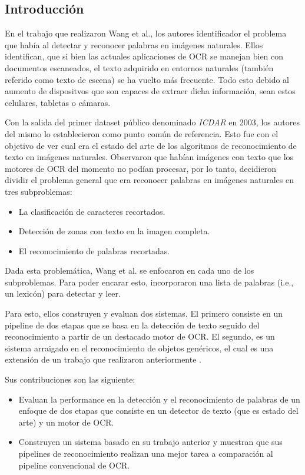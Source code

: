 \subsection{Introducción}

	En el trabajo que realizaron Wang et al., los autores identificador el problema que había al detectar y reconocer palabras en imágenes naturales. Ellos identifican, que si bien las actuales aplicaciones de OCR se manejan bien con documentos escaneados, el texto adquirido en entornos naturales (también referido como texto de escena) se ha vuelto más frecuente. Todo esto debido al aumento de dispositvos que son capaces de extraer dicha información, sean estos celulares, tabletas o cámaras.
	
	Con la salida del primer dataset público denominado \textit{ICDAR} en 2003, los autores del mismo lo establecieron como punto común de referencia. Esto fue con el objetivo de ver cual era el estado del arte de los algoritmos de reconocimiento de texto en imágenes naturales. Observaron que habían imágenes con texto que los motores de OCR del momento no podían procesar, por lo tanto, decidieron dividir el problema general que era reconocer palabras en imágenes naturales en tres subproblemas:
	\begin{itemize}
		\item La clasificación de caracteres recortados.
		\item Detección de zonas con texto en la imagen completa.
		\item El reconocimiento de palabras recortadas.
	\end{itemize}
	
	Dada esta problemática, Wang et al. se enfocaron en cada uno de los subproblemas. Para poder encarar esto, incorporaron una lista de palabras (i.e., un lexicón) para detectar y leer.
		
	Para esto, ellos construyen y evaluan dos sistemas. El primero consiste en un pipeline de dos etapas que se basa en la detección de texto seguido del reconocimiento a partir de un destacado motor de OCR. El segundo, es un sistema arraigado en el reconocimiento de objetos genéricos, el cual es una extensión de un trabajo que realizaron anteriormente \cite{WB10}.
	
	Sus contribuciones son las siguiente:
		\begin{itemize}
			\item Evaluan la performance en la detección y el reconocimiento de palabras de un enfoque de dos etapas que consiste en un detector de texto (que es estado del arte) y un motor de OCR.
			\item Construyen un sistema basado en su trabajo anterior \cite{WB10} y muestran que sus pipelines de reconocimiento realizan una mejor tarea a comparación al pipeline convencional de OCR.
		\end{itemize}